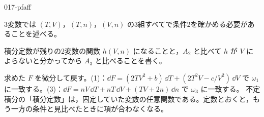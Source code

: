 \documentclass[uplatex,dvipdfmx,a4paper,11pt]{jsarticle}
\begin{document}
\begin{kaisetsu}{017-pfaff}
\begin{ronten}
  \item {} 3変数では $(T,V)$，$(T,n)$，$(V,n)$ の3組すべてで条件2を確かめる必要があることを述べる。
  \item {} 積分定数が残りの2変数の関数 $h(V,n)$ になることと，$A_{2}$ と比べて $h$ が $V$ によらないと分かってから $A_{3}$ と比べることを書く。
\end{ronten}
\kenzan 求めた $F$ を微分して戻す。(1)：$\dd F = (2TV^{2} + b)\,\dd T + (2T^{2}V - c/V^{2})\,\dd V$ で $\omega_{1}$ に一致する。(3)：$\dd F = nV\,\dd T + nT\,\dd V + (TV + 2n)\,\dd n$ で $\omega_{3}$ に一致する。
\tsumazuki 不定積分の「積分定数」は，固定していた変数の任意関数である。定数とおくと，もう一方の条件と見比べたときに項が合わなくなる。
\end{kaisetsu}

\end{document}
